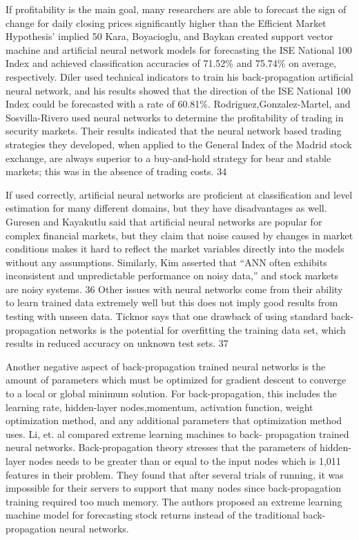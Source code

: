 \documentclass[../main.tex]{subfiles}
\begin{document}
    If profitability is the main goal, many researchers are able to forecast the sign of change for daily closing prices significantly higher than the Efficient Market Hypothesis’ implied 50%
    Kara, Boyacioglu, and Baykan created support vector machine and artificial neural network models for forecasting the ISE National 100 Index and achieved classification accuracies of 71.52\% and 75.74\% on average, respectively.
    Diler used technical indicators to train his back-propagation artificial neural network, and his results showed that the direction of the ISE National 100 Index could be forecasted with a rate of 60.81\%.
    Rodriguez,Gonzalez-Martel, and Sosvilla-Rivero used neural networks to determine the profitability of trading in security markets.
    Their results indicated that the neural network based trading strategies they developed, when applied to the General Index of the Madrid stock exchange, are always superior to a buy-and-hold strategy for bear and stable markets; this was in the absence of trading costs. 34

    If used correctly, artificial neural networks are proficient at classification and level estimation for many different domains, but they have disadvantages as well.
    Guresen and Kayakutlu said that artificial neural networks are popular for complex financial markets, but they claim that noise caused by changes in market conditions makes it hard to reflect the market variables directly into the models without any assumptions.
    Similarly, Kim asserted that “ANN often exhibits inconsistent and unpredictable performance on noisy data,” and stock markets are noisy systems. 36
    Other issues with neural networks come from their ability to learn trained data extremely well but this does not imply good results from testing with unseen data.
    Ticknor says that one drawback of using standard back-propagation networks is the potential for overfitting the training data set, which results in reduced accuracy on unknown test sets. 37

    Another negative aspect of back-propagation trained neural networks is the amount of parameters which must be optimized for gradient descent to converge to a local or global minimum solution.
    For back-propagation, this includes the learning rate, hidden-layer nodes,momentum, activation function, weight optimization method, and any additional parameters that optimization method uses.
    Li, et. al compared extreme learning machines to back- propagation trained neural networks.
    Back-propagation theory stresses that the parameters of hidden-layer nodes needs to be greater than or equal to the input nodes which is 1,011 features in their problem.
    They found that after several trials of running, it was impossible for their servers to support that many nodes since back-propagation training required too much memory.
    The authors proposed an extreme learning machine model for forecasting stock returns instead of the traditional back-propagation neural networks.
\end{document}
